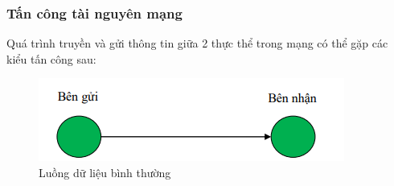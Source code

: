 \subsubsection*{Tấn công tài nguyên mạng}

Quá trình truyền và gửi thông tin giữa 2 thực thể trong mạng có thể gặp các kiểu tấn công sau:
\begin{figure}[H]
    \centering
    \includegraphics{normal-traffic}
    \caption{Luồng dữ liệu bình thường}
     
\end{figure}
